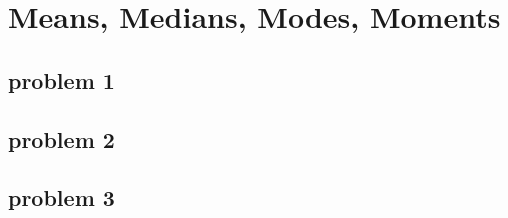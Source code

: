 \section{Means, Medians, Modes, Moments}

\subsection{problem 1}

\subsection{problem 2}

\subsection{problem 3}


